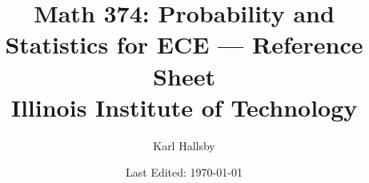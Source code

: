 



\DeclareMathOperator{\EventClass}{\mathcal{F}}
\DeclareMathOperator{\Prob}{\operatorname{P}}
\DeclareMathOperator{\ExpectedValue}{\operatorname{\mathbb{E}}}
\DeclareMathOperator{\Variance}{\operatorname{VAR}}
\DeclareMathOperator{\StdDev}{\operatorname{STD}}
\DeclareMathOperator{\Covariance}{\operatorname{Cov}}
\DeclareMathOperator{\DrawnIID}{\overset{\text{iid}}{\DrawnFrom}}
\DeclareMathOperator{\Bias}{\operatorname{B}}
\DeclareMathOperator{\MeanSqErr} {\operatorname{MSE}}
\DeclareMathOperator{\Likelihood}{\mathcal{L}}
\DeclareMathOperator{\MaxLikeEstim}{\operatorname{MLE}}

\DeclareMathOperator{\Given}{\vert}
\DeclareMathOperator{\DrawnFrom}{\sim}

\begin{titlepage}
  \title{Math 374: Probability and Statistics for ECE --- Reference Sheet \\ Illinois Institute of Technology}
  \author{Karl Hallsby}
  \date{Last Edited: \today}
\end{titlepage}


\maketitle
{} %
\tableofcontents
\clearpage
{} %






